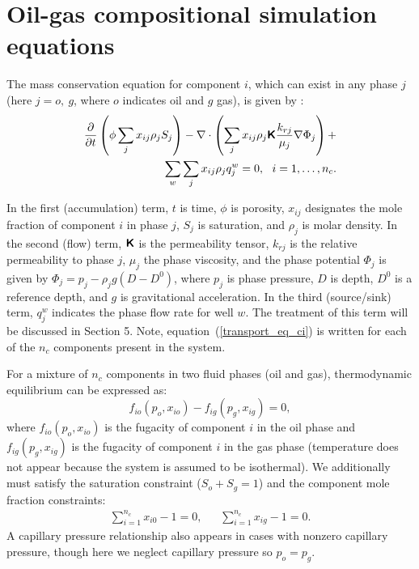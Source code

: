 \documentclass[twocolumn,numbook]{svjour3}          %
\begin{document}
\section{Oil-gas compositional simulation equations} \label{sec:forward}


The mass conservation equation for component $i$, which can exist in any
phase $j$ (here $j=o,~g$, where $o$ indicates oil and $g$ gas), is given
by \cite{Cao:Thesis,Voskov_nonlinear:2009,Voskov:2012}:
%
\begin{align}
\label{transport_eq_ci}
\dfrac{\partial}{\partial t} \left(\phi
  \sum_{j} x_{ij} \rho_j S_j \right)
    - \nabla \cdot \left ( \sum_{j} x_{ij} \rho_j  \boldsymbol{\mathsf{K}}
      \dfrac{k_{rj}}{\mu_j}\nabla \Phi_j \right ) + \\ \sum_{w} \sum_{j} x_{ij} \rho_j q_j^w = 0, \ \ i = 1,\ldots,n_c. \nonumber
\end{align}
%

In the first (accumulation) term, $t$ is time, $\phi$ is porosity, $x_{ij}$
designates the mole fraction of component $i$ in phase $j$, $S_j$ is saturation,
and $\rho_j$ is molar density. In the second (flow) term,  $\boldsymbol{\mathsf{K}}$ 
is the permeability tensor, $k_{rj}$ is the relative permeability to
phase $j$, $\mu_j$ the phase viscosity, and the phase potential
$\Phi_j$ is given by $\Phi_j = p_j-\rho_j g(D-D^0)$, where $p_j$ is
phase pressure, $D$ is depth, $D^0$ is a reference depth, and $g$ is
gravitational acceleration. In the third (source/sink) term, $q_j^w$
indicates the phase flow rate for well $w$. The treatment of this term will be discussed in Section 5.
Note, equation~(\ref{transport_eq_ci}) is written for each of the $n_c$
components present in the system.

For a mixture of $n_c$ components in two fluid phases (oil and gas), thermodynamic equilibrium
can be expressed as:
%
\begin{equation} \label{general_therm_system1} f_{io}(p_o, x_{io}) - f_{ig}(p_g,
  x_{ig}) = 0,  \end{equation}
%
where $f_{io}(p_o, x_{io})$ is the fugacity of component $i$ in the oil phase and $f_{ig}(p_g, x_{ig})$ 
is the fugacity of component $i$ in the gas phase (temperature does not appear because the system is assumed to
be isothermal).
We additionally must satisfy the saturation constraint ($S_o+S_g=1$) and the
component mole fraction constraints:
%
\begin{align}\label{eqn:MoleFractionCons} \sum_{i=1}^{n_c} x_{i0} -1 = 0, \ \ \
    \ \ \ \ \sum_{i=1}^{n_c} x_{ig} -1 = 0.  \end{align}
%
A capillary pressure relationship also appears in cases with nonzero capillary
pressure, though here we neglect capillary pressure so $p_o=p_g$.
\end{document}
